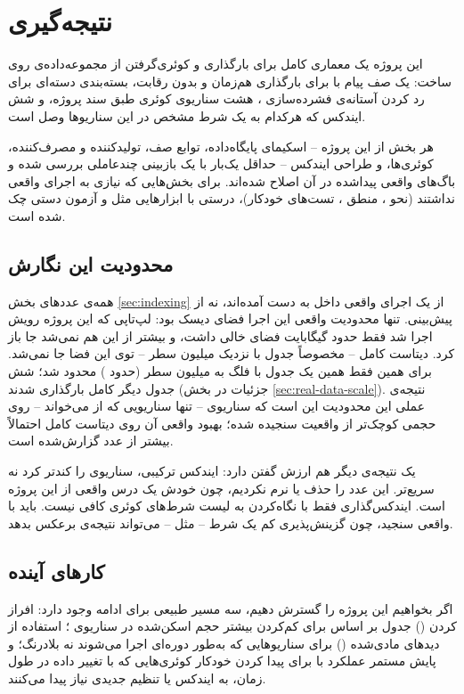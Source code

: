 \section{نتیجه‌گیری}
\label{sec:conclusion}

این پروژه یک معماری کامل برای بارگذاری و کوئری‌گرفتن از مجموعه‌داده‌ی  روی  ساخت: یک صف پیام با  برای بارگذاری هم‌زمان و بدون رقابت، بسته‌بندی دسته‌ای برای رد کردن آستانه‌ی فشرده‌سازی ، هشت سناریوی کوئری طبق سند پروژه، و شش ایندکس که هرکدام به یک شرط مشخص در این سناریوها وصل است.

هر بخش از این پروژه -- اسکیمای پایگاه‌داده، توابع صف، تولیدکننده و مصرف‌کننده، کوئری‌ها، و طراحی ایندکس -- حداقل یک‌بار با یک بازبینی چندعاملی بررسی شده و باگ‌های واقعی پیداشده در آن اصلاح شده‌اند. برای بخش‌هایی که نیازی به اجرای واقعی نداشتند (نحو ، منطق ، تست‌های خودکار)، درستی با ابزارهایی مثل  و آزمون دستی چک شده است.

\subsection{محدودیت این نگارش}

همه‌ی عددهای بخش \ref{sec:indexing} از یک اجرای واقعی  داخل  به دست آمده‌اند، نه از پیش‌بینی. تنها محدودیت واقعی این اجرا فضای دیسک بود: لپ‌تاپی که این پروژه رویش اجرا شد فقط حدود  گیگابایت فضای خالی داشت، و بیشتر از این هم نمی‌شد جا باز کرد. دیتاست کامل  -- مخصوصاً جدول  با نزدیک  میلیون سطر -- توی این فضا جا نمی‌شد. برای همین فقط همین یک جدول با فلگ  به  میلیون سطر (حدود ) محدود شد؛ شش جدول دیگر کامل بارگذاری شدند (جزئیات در بخش \ref{sec:real-data-scale}). نتیجه‌ی عملی این محدودیت این است که سناریوی  -- تنها سناریویی که از  می‌خواند -- روی حجمی کوچک‌تر از واقعیت سنجیده شده؛ بهبود واقعی آن روی دیتاست کامل احتمالاً بیشتر از عدد گزارش‌شده است.

یک نتیجه‌ی دیگر هم ارزش گفتن دارد: ایندکس  ترکیبی، سناریوی  را کندتر کرد نه سریع‌تر. این عدد را حذف یا نرم نکردیم، چون خودش یک درس واقعی از این پروژه است. ایندکس‌گذاری فقط با نگاه‌کردن به لیست شرط‌های کوئری کافی نیست. باید با  واقعی سنجید، چون گزینش‌پذیری کم یک شرط -- مثل  -- می‌تواند نتیجه‌ی برعکس بدهد.

\subsection{کارهای آینده}

اگر بخواهیم این پروژه را گسترش دهیم، سه مسیر طبیعی برای ادامه وجود دارد: افراز کردن () جدول  بر اساس  برای کم‌کردن بیشتر حجم اسکن‌شده در سناریوی ؛ استفاده از دیدهای مادی‌شده () برای سناریوهایی که به‌طور دوره‌ای اجرا می‌شوند نه بلادرنگ؛ و پایش مستمر عملکرد با  برای پیدا کردن خودکار کوئری‌هایی که با تغییر داده در طول زمان، به ایندکس یا تنظیم جدیدی نیاز پیدا می‌کنند.
